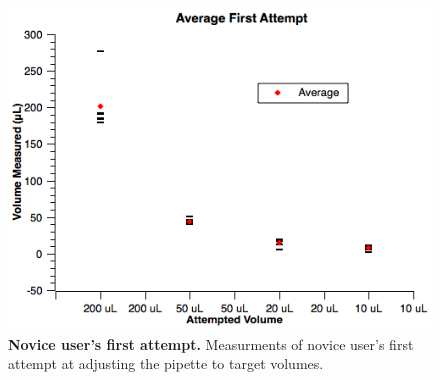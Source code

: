\documentclass[]{article}
\begin{document}
\begin{figure}
\includegraphics[scale=0.7]{fig3.png}
\caption{
{\bf Novice user's first attempt.} Measurments of novice user's first attempt at adjusting the pipette to target volumes.
}
\label{figure3}
\end{figure}




\end{document}
